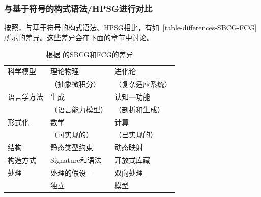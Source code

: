 \subsubsection{与基于符号的构式语法/HPSG进行对比}

按照\indexhpsgstartc\indexsbcgstartc \citet{vanTrijp2013a}，与基于符号的构式语法、HPSG相比，有如~\vref{table-differences-SBCG-FCG}所示的差异。这些差异会在下面的章节中讨论。
%
\begin{table}
\caption{\label{table-differences-SBCG-FCG}根据 \citet[]{vanTrijp2013a}的SBCG和FCG的差异}
\begin{tabular}{@{}lll@{}}\hline\hline
科学模型    & 理论物理           & 进化论\\
                    & （抽象微积分）           &  （复杂适应系统）\\
语言学方法 & 生成                    & 认知—功能\\
                    & （语言能力模型）          & （剖析和生成）\\
形式化       & 数学                 & 计算\\ 
                    & （可实现的） & （已实现的）\\
结构       & 静态类型约束       & 动态映射\\
构造方式       & Signature和语法         & 开放式库藏\\
处理          & 处理的假设—     & 双向处理\\
                    & 独立                  & 模型\\\hline\hline
\end{tabular}
\end{table}%
